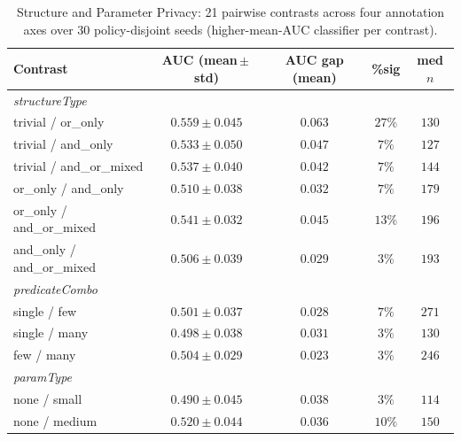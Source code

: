 \begin{table}[htbp]
  \caption{Structure and Parameter Privacy: 21 pairwise contrasts across four annotation
    axes over 30 policy-disjoint seeds (higher-mean-AUC classifier per contrast).}
  \label{tab:spp-contrasts}
  \centering\footnotesize
  \begin{tabular}{lcccc}
    \toprule
    Contrast & AUC (mean\,$\pm$\,std) & AUC gap (mean) & \%sig & med $n$ \\
    \midrule
    \multicolumn{5}{l}{\textit{structureType}} \\
    trivial / or\_only          & $0.559 \pm 0.045$ & $0.063$ & $27\%$  & $130$ \\
    trivial / and\_only         & $0.533 \pm 0.050$ & $0.047$ & $7\%$  & $127$ \\
    trivial / and\_or\_mixed    & $0.537 \pm 0.040$ & $0.042$ & $7\%$  & $144$ \\
    or\_only / and\_only        & $0.510 \pm 0.038$ & $0.032$ & $7\%$  & $179$ \\
    or\_only / and\_or\_mixed   & $0.541 \pm 0.032$ & $0.045$ & $13\%$ & $196$ \\
    and\_only / and\_or\_mixed  & $0.506 \pm 0.039$ & $0.029$ & $3\%$  & $193$ \\
    \midrule
    \multicolumn{5}{l}{\textit{predicateCombo}} \\
    single / few                & $0.501 \pm 0.037$ & $0.028$ & $7\%$ & $271$ \\
    single / many               & $0.498 \pm 0.038$ & $0.031$ & $3\%$  & $130$ \\
    few / many                  & $0.504 \pm 0.029$ & $0.023$ & $3\%$ & $246$ \\
    \midrule
    \multicolumn{5}{l}{\textit{paramType}} \\
    none / small                & $0.490 \pm 0.045$ & $0.038$ & $3\%$ & $114$ \\
    none / medium               & $0.520 \pm 0.044$ & $0.036$ & $10\%$  & $150$ \\

\end{tabular}
\end{table}
